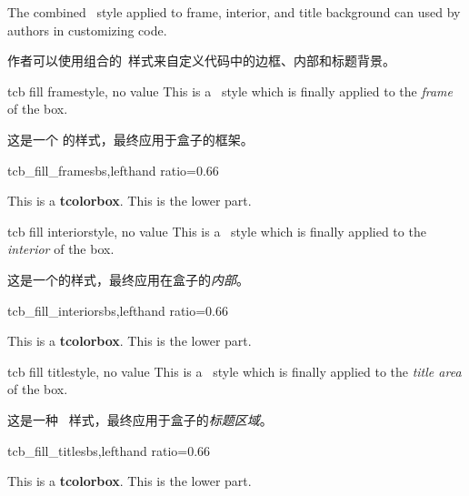 The combined \tikzname\ style applied to frame, interior, and title
background can used by authors in customizing code.

作者可以使用组合的\tikzname\ 样式来自定义代码中的边框、内部和标题背景。

\begin{docTikzKey}{tcb fill frame}{}{style, no value}
This is a \tikzname\ style which is finally applied to the \emph{frame}
of the box.

这是一个 \tikzname 的样式，最终应用于盒子的框架。
\begin{exdispExample*}{tcb_fill_frame}{sbs,lefthand ratio=0.66}

\begin{tcolorbox}[title=My title]
This is a \textbf{tcolorbox}.
\tcblower
This is the lower part.
\end{tcolorbox}
\end{exdispExample*}
\end{docTikzKey}


\begin{docTikzKey}{tcb fill interior}{}{style, no value}
This is a \tikzname\ style which is finally applied to the \emph{interior}
of the box.

这是一个\tikzname 的样式，最终应用在盒子的\emph{内部}。
\begin{exdispExample*}{tcb_fill_interior}{sbs,lefthand ratio=0.66}

\begin{tcolorbox}[title=My title]
This is a \textbf{tcolorbox}.
\tcblower
This is the lower part.
\end{tcolorbox}
\end{exdispExample*}
\end{docTikzKey}


\begin{docTikzKey}{tcb fill title}{}{style, no value}
This is a \tikzname\ style which is finally applied to the \emph{title area}
of the box.

这是一种 \tikzname\ 样式，最终应用于盒子的\emph{标题区域}。
\begin{exdispExample*}{tcb_fill_title}{sbs,lefthand ratio=0.66}

\begin{tcolorbox}[title=My title]
This is a \textbf{tcolorbox}.
\tcblower
This is the lower part.
\end{tcolorbox}
\end{exdispExample*}
\end{docTikzKey}